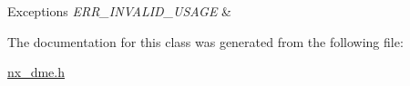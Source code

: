 \begin{DoxyExceptions}{Exceptions}
{\em E\+R\+R\+\_\+\+I\+N\+V\+A\+L\+I\+D\+\_\+\+U\+S\+A\+GE} & \\
\hline
\end{DoxyExceptions}


The documentation for this class was generated from the following file\+:\begin{DoxyCompactItemize}
\item 
\mbox{\hyperlink{nx__dme_8h}{nx\+\_\+dme.\+h}}\end{DoxyCompactItemize}
